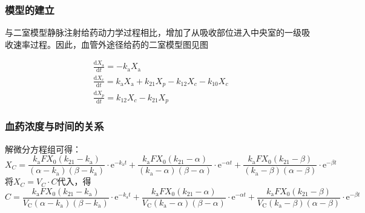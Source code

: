 \documentclass[dvipsnames, svgnames, x11names]{beamer}
\begin{document}
\begin{frame}
    \frametitle{模型的建立}
    与二室模型静脉注射给药动力学过程相比，增加了从吸收部位进入中央室的一级吸收速率过程。因此，血管外途径给药的二室模型图见图
    \begin{center}
    \end{center}
    \[
        \begin{aligned}
            &\frac{\mathrm{d}X_{\mathrm{a}}}{\mathrm{d}t} = -k_{\mathrm{a}}X_{\mathrm{a}} \\
            &\frac{\mathrm{d}X_{c}}{\mathrm{d}t} =k_{\mathrm{a}}X_{\mathrm{a}} + k_{21}X_{p}-k_{{12}}X_{c}-k_{{10}}X_{c}  \\
            &\frac{\mathrm{d}X_{p}}{\mathrm{d}t} =k_{{12}}X_{c}-k_{{21}}X_{p} 
        \end{aligned}
    \]
\end{frame}


\begin{frame}
    \frametitle{血药浓度与时间的关系}
    解微分方程组可得：
    \[
        X_{{C}}=\frac{k_{\mathrm{a}}FX_{0}(k_{21}-k_{\mathrm{a}})}{(\alpha-k_{\mathrm{a}})(\beta-k_{\mathrm{a}})}\cdot\mathrm{e}^{-k_{\mathrm{a}}t}+\frac{k_{\mathrm{a}}FX_{0}(k_{21}-\alpha)}{(k_{\mathrm{a}}-\alpha)(\beta-\alpha)}\cdot\mathrm{e}^{-\alpha t}+\frac{k_{\mathrm{a}}FX_{0}(k_{21}-\beta)}{(k_{\mathrm{a}}-\beta)(\alpha-\beta)}\cdot\mathrm{e}^{-\beta t}
    \]
    将$X_{{C}}=V_{{C}}\cdot C$代入，得
    \[
        C=\frac{k_{\mathrm{a}}FX_{0}(k_{21}-k_{\mathrm{a}})}{V_{\mathrm{C}}(\alpha-k_{\mathrm{a}})(\beta-k_{\mathrm{a}})}\cdot\mathrm{e}^{-k_{\mathrm{a}}t}+\frac{k_{\mathrm{a}}FX_{0}(k_{21}-\alpha)}{V_{\mathrm{C}}(k_{\mathrm{a}}-\alpha)(\beta-\alpha)}\cdot\mathrm{e}^{-\alpha t}+\frac{k_{\mathrm{a}}FX_{0}(k_{21}-\beta)}{V_{\mathrm{C}}(k_{\mathrm{a}}-\beta)(\alpha-\beta)}\cdot\mathrm{e}^{-\beta t}
    \]
\end{frame}
\end{document}
